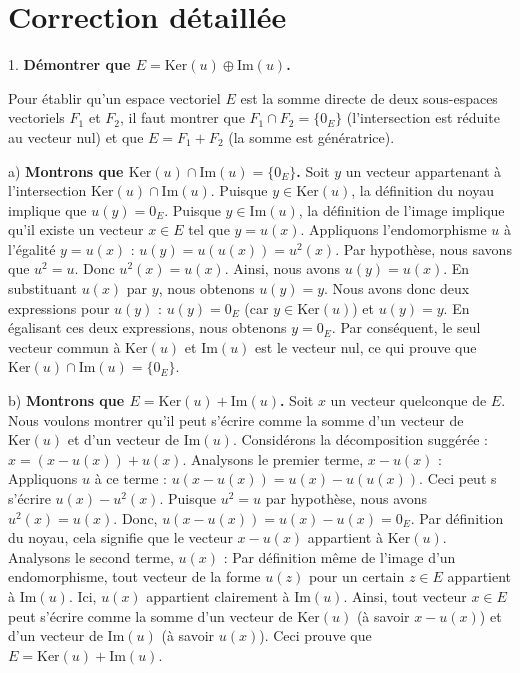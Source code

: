 \documentclass{report}
\begin{document}
\section*{Correction détaillée}

1.  \textbf{Démontrer que $E = \text{Ker}(u) \oplus \text{Im}(u)$.}

    Pour établir qu'un espace vectoriel $E$ est la somme directe de deux sous-espaces vectoriels $F_1$ et $F_2$, il faut montrer que $F_1 \cap F_2 = \{0_E\}$ (l'intersection est réduite au vecteur nul) et que $E = F_1 + F_2$ (la somme est génératrice).

    a) \textbf{Montrons que $\text{Ker}(u) \cap \text{Im}(u) = \{0_E\}$.}
    Soit $y$ un vecteur appartenant à l'intersection $\text{Ker}(u) \cap \text{Im}(u)$.
    Puisque $y \in \text{Ker}(u)$, la définition du noyau implique que $u(y) = 0_E$.
    Puisque $y \in \text{Im}(u)$, la définition de l'image implique qu'il existe un vecteur $x \in E$ tel que $y = u(x)$.
    Appliquons l'endomorphisme $u$ à l'égalité $y = u(x)$ :
    $u(y) = u(u(x)) = u^2(x)$.
    Par hypothèse, nous savons que $u^2 = u$. Donc $u^2(x) = u(x)$.
    Ainsi, nous avons $u(y) = u(x)$.
    En substituant $u(x)$ par $y$, nous obtenons $u(y) = y$.
    Nous avons donc deux expressions pour $u(y)$ : $u(y) = 0_E$ (car $y \in \text{Ker}(u)$) et $u(y) = y$.
    En égalisant ces deux expressions, nous obtenons $y = 0_E$.
    Par conséquent, le seul vecteur commun à $\text{Ker}(u)$ et $\text{Im}(u)$ est le vecteur nul, ce qui prouve que $\text{Ker}(u) \cap \text{Im}(u) = \{0_E\}$.

    b) \textbf{Montrons que $E = \text{Ker}(u) + \text{Im}(u)$.}
    Soit $x$ un vecteur quelconque de $E$. Nous voulons montrer qu'il peut s'écrire comme la somme d'un vecteur de $\text{Ker}(u)$ et d'un vecteur de $\text{Im}(u)$.
    Considérons la décomposition suggérée : $x = (x - u(x)) + u(x)$.
    Analysons le premier terme, $x - u(x)$ :
    Appliquons $u$ à ce terme : $u(x - u(x)) = u(x) - u(u(x))$.
    Ceci peut s s'écrire $u(x) - u^2(x)$.
    Puisque $u^2 = u$ par hypothèse, nous avons $u^2(x) = u(x)$.
    Donc, $u(x - u(x)) = u(x) - u(x) = 0_E$.
    Par définition du noyau, cela signifie que le vecteur $x - u(x)$ appartient à $\text{Ker}(u)$.
    Analysons le second terme, $u(x)$ :
    Par définition même de l'image d'un endomorphisme, tout vecteur de la forme $u(z)$ pour un certain $z \in E$ appartient à $\text{Im}(u)$. Ici, $u(x)$ appartient clairement à $\text{Im}(u)$.
    Ainsi, tout vecteur $x \in E$ peut s'écrire comme la somme d'un vecteur de $\text{Ker}(u)$ (à savoir $x - u(x)$) et d'un vecteur de $\text{Im}(u)$ (à savoir $u(x)$).
    Ceci prouve que $E = \text{Ker}(u) + \text{Im}(u)$.
\end{document}
